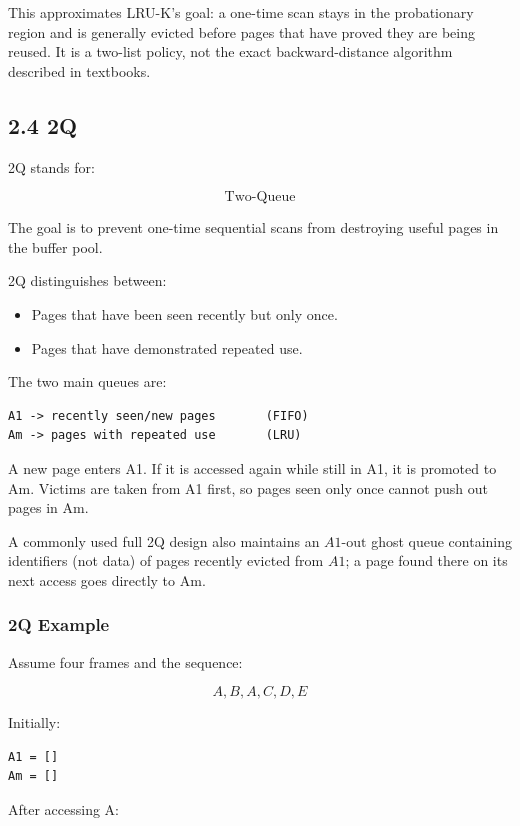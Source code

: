\documentclass[12pt,a4paper]{article}
\begin{document}
This approximates LRU-K's goal: a one-time scan stays in the probationary region and is generally
evicted before pages that have proved they are being reused. It is a two-list policy, not the exact
backward-distance algorithm described in textbooks.

\subsection{2.4 2Q}

2Q stands for:

\[
\boxed{\text{Two-Queue}}
\]

The goal is to prevent one-time sequential scans from destroying useful pages in the buffer pool.

2Q distinguishes between:

\begin{itemize}
    \item Pages that have been seen recently but only once.
    \item Pages that have demonstrated repeated use.
\end{itemize}

The two main queues are:

\begin{verbatim}
A1 -> recently seen/new pages       (FIFO)
Am -> pages with repeated use       (LRU)
\end{verbatim}

A new page enters A1. If it is accessed again while still in A1, it is promoted to Am.
Victims are taken from A1 first, so pages seen only once cannot push out pages in Am.

A commonly used full 2Q design also maintains an $A1\text{-out}$ ghost queue containing identifiers (not data) of pages recently evicted from $A1$; a page found there on its next access goes directly to Am.

\subsubsection{2Q Example}

Assume four frames and the sequence:

\[
A,B,A,C,D,E
\]

Initially:

\begin{verbatim}
A1 = []
Am = []
\end{verbatim}

After accessing A:
\end{document}
